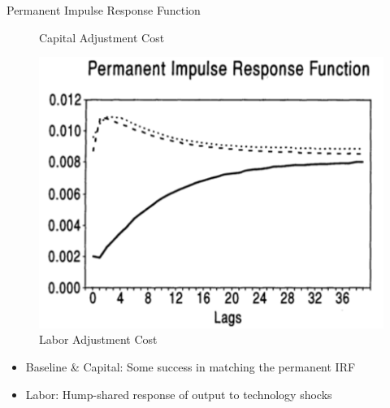 \documentclass[10pt]{beamer}
\begin{document}
\begin{frame}{Permanent Impulse Response Function}
\begin{minipage}{0.33\textwidth}
\begin{figure}
  \caption{Capital Adjustment Cost}
\end{figure}
\end{minipage}%
\begin{minipage}{0.33\textwidth}
\begin{figure}
  \centering
  \includegraphics[width=\linewidth]{L_per_IRF.png}
  \caption{Labor Adjustment Cost}
\end{figure}
\end{minipage}

\begin{itemize}
    \item Baseline \& Capital: Some success in matching the permanent IRF
    \item Labor: Hump-shared response of output to technology shocks
\end{itemize}

\end{frame}
\end{document}
